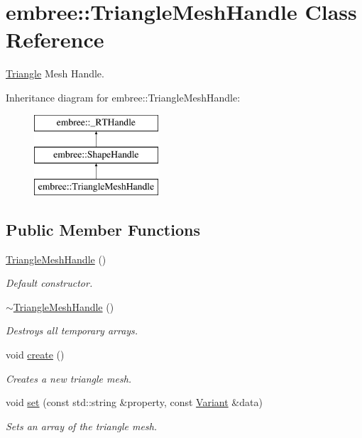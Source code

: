 \hypertarget{classembree_1_1_triangle_mesh_handle}{
\section{embree::TriangleMeshHandle Class Reference}
\label{classembree_1_1_triangle_mesh_handle}
}


\hyperlink{classembree_1_1_triangle}{Triangle} Mesh Handle.  


Inheritance diagram for embree::TriangleMeshHandle:\begin{figure}[H]
\begin{center}
\leavevmode
\includegraphics[height=3.000000cm]{classembree_1_1_triangle_mesh_handle}
\end{center}
\end{figure}
\subsection*{Public Member Functions}
\begin{DoxyCompactItemize}
\item 
\hyperlink{classembree_1_1_triangle_mesh_handle_ab1c88eda9467eee729962ad72ab485a4}{TriangleMeshHandle} ()
\begin{DoxyCompactList}\small\item\em Default constructor. \item\end{DoxyCompactList}\item 
\hyperlink{classembree_1_1_triangle_mesh_handle_af88d82911f201ed770858000079ced25}{$\sim$TriangleMeshHandle} ()
\begin{DoxyCompactList}\small\item\em Destroys all temporary arrays. \item\end{DoxyCompactList}\item 
void \hyperlink{classembree_1_1_triangle_mesh_handle_a53385a149e3205c6044898b4adfc4bbf}{create} ()
\begin{DoxyCompactList}\small\item\em Creates a new triangle mesh. \item\end{DoxyCompactList}\item 
void \hyperlink{classembree_1_1_triangle_mesh_handle_a0a6d78c9b8f82b2a9f87349e5cd92560}{set} (const std::string \&property, const \hyperlink{structembree_1_1_variant}{Variant} \&data)
\begin{DoxyCompactList}\small\item\em Sets an array of the triangle mesh. \item\end{DoxyCompactList}\end{DoxyCompactItemize}
